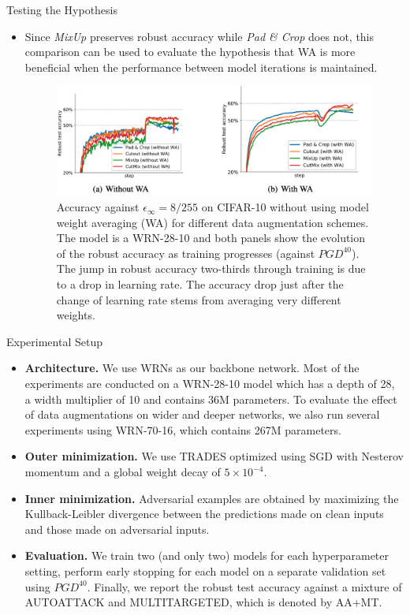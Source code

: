 \begin{frame}{Testing the Hypothesis}
    \begin{itemize}
        \item Since \textit{MixUp} preserves robust accuracy while \textit{Pad \& Crop} does not, this comparison can be used to evaluate the hypothesis that WA is more beneficial when the performance between model iterations is maintained.
        \begin{figure}
            \centering
            \includegraphics[height=.4\textheight]{pic/data_aug_wa.png}
            \caption{Accuracy against $\epsilon_\infty = 8/255$ on CIFAR-10 without using model weight averaging (WA) for different data augmentation schemes. The model is a WRN-28-10 and both panels show the evolution of the robust accuracy as training progresses (against $PGD^{40}$). The jump in robust accuracy two-thirds through training is due to a drop in learning rate. The accuracy drop just after the change of learning rate stems from averaging very different weights.}
            \label{fig:data_aug_wa}
        \end{figure}
    \end{itemize}
\end{frame}

\begin{frame}{Experimental Setup}
    \begin{itemize}
        \item \textbf{Architecture.} We use WRNs as our backbone network. Most of the experiments are conducted on a WRN-28-10 model which has a depth of 28, a width multiplier of 10 and contains 36M parameters. To evaluate the effect of data augmentations on wider and deeper networks, we also run several experiments using WRN-70-16, which contains 267M parameters.
        \item \textbf{Outer minimization.} We use TRADES optimized using SGD with Nesterov momentum and a global weight decay of $5 \times 10^{-4}$.
        \item \textbf{Inner minimization.} Adversarial examples are obtained by maximizing the Kullback-Leibler divergence between the predictions made on clean inputs and those made on adversarial inputs. 
        \item \textbf{Evaluation.} We train two (and only two) models for each hyperparameter setting, perform early stopping for each model on a separate validation set using $PGD^{40}$. Finally, we report the robust test accuracy against a mixture of AUTOATTACK and MULTITARGETED, which is denoted by AA+MT.
    \end{itemize}
\end{frame}